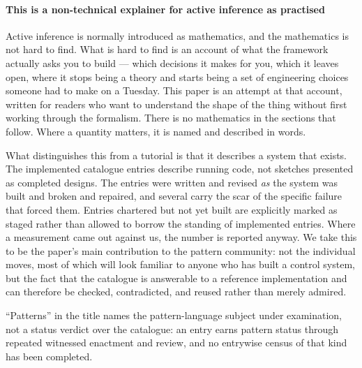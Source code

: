 
\paragraph{This is a non-technical explainer for active inference as practised} Active inference is normally introduced as mathematics, and the mathematics is
not hard to find.  What is hard to find is an account of what the framework
actually asks you to build --- which decisions it makes for you, which it leaves
open, where it stops being a theory and starts being a set of engineering
choices someone had to make on a Tuesday.  This paper is an attempt at that
account, written for readers who want to understand the shape of the thing
without first working through the formalism.  There is no mathematics in the
sections that follow.  Where a quantity matters, it is named and described in
words.

What distinguishes this from a tutorial is that it describes a system that
exists.  The implemented catalogue entries describe running code, not
sketches presented as completed designs.  The entries were written and revised
\emph{as} the system was built and broken and repaired, and several carry the
scar of the specific failure that forced them.  Entries chartered but not yet
built are explicitly marked as staged rather than allowed to borrow the standing
of implemented entries.  Where a measurement came out against us, the
number is reported anyway.  We take this to be the paper's main contribution to
the pattern community: not the individual moves, most of which will look
familiar to anyone who has built a control system, but the fact that the
catalogue is answerable to a reference implementation and can therefore be
checked, contradicted, and reused rather than merely admired.

``Patterns'' in the title names the pattern-language subject under
examination, not a status verdict over the catalogue: an entry earns pattern
status through repeated witnessed enactment and review, and no entrywise
census of that kind has been completed.

